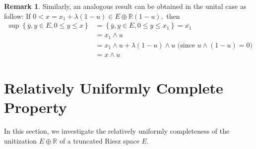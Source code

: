 \documentclass{birkau}
\numberwithin{equation}{section}
\theoremstyle{plain}
\theoremstyle{definition}
\newtheorem{remark}[theorem]{Remark}
\begin{document}
\begin{remark}
	Similarly, an analogous result can be obtained in the unital case as follow:
	If $0<x=x_{1}+\lambda\left(  1-u\right)  \in E\oplus%
	\mathbb{R}
	\left(  1-u\right)  ,$ then%
	\begin{align*}
		\sup\left\{  \bar{y},y\in E,0\leq y\leq x\right\}    & =\left\{  \bar{y},y\in
		E,0\leq y\leq x_{1}\right\}  =\overline{x_{1}}\\
		& =x_{1}\wedge u\\
		& =x_{1}\wedge u+\lambda\left(  1-u\right)  \wedge u\text{ (since }%
		u\wedge\left(  1-u\right)  =0)\\
		& =x\wedge u
	\end{align*}
\end{remark}
\section{Relatively Uniformly Complete Property}
	In this section, we investigate the relatively uniformly completeness of the
	unitization $E \oplus\mathbb{R}$ of a truncated Riesz space $E$.
	
\end{document}

